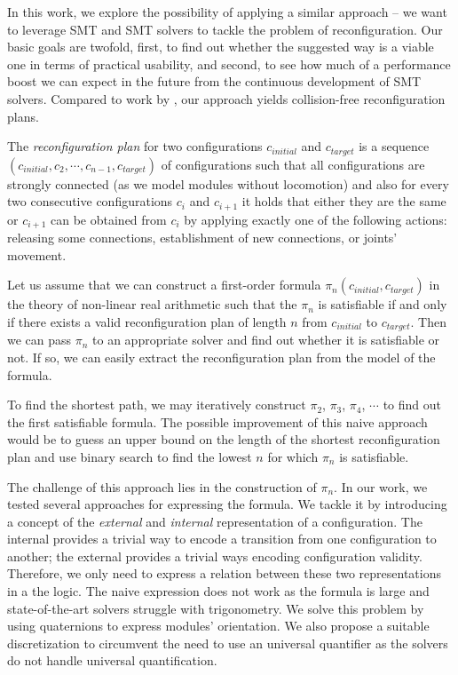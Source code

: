 In this work, we explore the possibility of applying a similar approach -- we
want to leverage SMT and SMT solvers to tackle the problem of reconfiguration.
Our basic goals are twofold, first, to find out whether the suggested way is a
viable one in terms of practical usability, and second, to see how much of a
performance boost we can expect in the future from the continuous development of
SMT solvers. Compared to work by \textcite{DBLP:journals/pcs/GorbenkoP12}, our
approach yields collision-free reconfiguration plans.

The \emph{reconfiguration plan} for two configurations $c_{initial}$ and
$c_{target}$ is a sequence $(c_{initial}, c_2, \cdots, c_{n - 1}, c_{target})$
of configurations such that all configurations are strongly connected (as we
model modules without locomotion) and also for every two consecutive
configurations $c_i$ and $c_{i+1}$ it holds that either they are the same or
$c_{i+1}$ can be obtained from ${c_i}$  by applying exactly one of the following
actions: releasing some connections, establishment of new connections, or
joints' movement.

Let us assume that we can construct a first-order formula
$\pi_{n}(c_{initial}, c_{target})$ in the theory of non-linear real arithmetic
such that the $\pi_n$ is satisfiable if and only if there exists a valid
reconfiguration plan of length $n$ from $c_{initial}$ to $c_{target}$. Then we
can pass $\pi_n$ to an appropriate solver and find out whether it is satisfiable
or not. If so, we can easily extract the reconfiguration plan from the model of
the formula.

To find the shortest path, we may iteratively construct $\pi_2$,
$\pi_3$, $\pi_4$, $\cdots$ to find out the first satisfiable formula. The
possible improvement of this naive approach would be to guess an upper bound on the
length of the shortest reconfiguration plan and use binary search to find the
lowest $n$ for which $\pi_n$ is satisfiable.

The challenge of this approach lies in the construction of $\pi_n$. In our work,
we tested several approaches for expressing the formula. We tackle it by
introducing a concept of the \emph{external} and \emph{internal} representation
of a configuration. The internal provides a trivial way to  encode a transition
from one configuration to another; the external provides a trivial ways encoding
configuration validity. Therefore, we only need to express a relation between
these two representations in a the logic. The naive expression does not work as
the formula is large and state-of-the-art solvers struggle with trigonometry. We
solve this problem by using quaternions to express modules' orientation. We also
propose a suitable discretization to circumvent the need to use an universal
quantifier as the solvers do not handle universal quantification.

